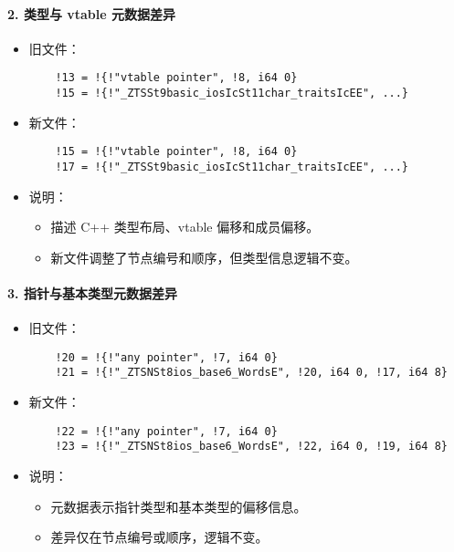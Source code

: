 \documentclass[UTF8,a4paper,10pt]{ctexart}
\begin{document}
\paragraph{2. 类型与 vtable 元数据差异}
\begin{itemize}
    \item 旧文件：
    \begin{verbatim}
    !13 = !{!"vtable pointer", !8, i64 0}
    !15 = !{!"_ZTSSt9basic_iosIcSt11char_traitsIcEE", ...}
    \end{verbatim}

    \item 新文件：
    \begin{verbatim}
    !15 = !{!"vtable pointer", !8, i64 0}
    !17 = !{!"_ZTSSt9basic_iosIcSt11char_traitsIcEE", ...}
    \end{verbatim}

    \item 说明：
    \begin{itemize}
        \item 描述 C++ 类型布局、vtable 偏移和成员偏移。
        \item 新文件调整了节点编号和顺序，但类型信息逻辑不变。
    \end{itemize}
\end{itemize}

\paragraph{3. 指针与基本类型元数据差异}
\begin{itemize}
    \item 旧文件：
    \begin{verbatim}
    !20 = !{!"any pointer", !7, i64 0}
    !21 = !{!"_ZTSNSt8ios_base6_WordsE", !20, i64 0, !17, i64 8}
    \end{verbatim}

    \item 新文件：
    \begin{verbatim}
    !22 = !{!"any pointer", !7, i64 0}
    !23 = !{!"_ZTSNSt8ios_base6_WordsE", !22, i64 0, !19, i64 8}
    \end{verbatim}

    \item 说明：
    \begin{itemize}
        \item 元数据表示指针类型和基本类型的偏移信息。
        \item 差异仅在节点编号或顺序，逻辑不变。
    \end{itemize}
\end{itemize}
\end{document}
